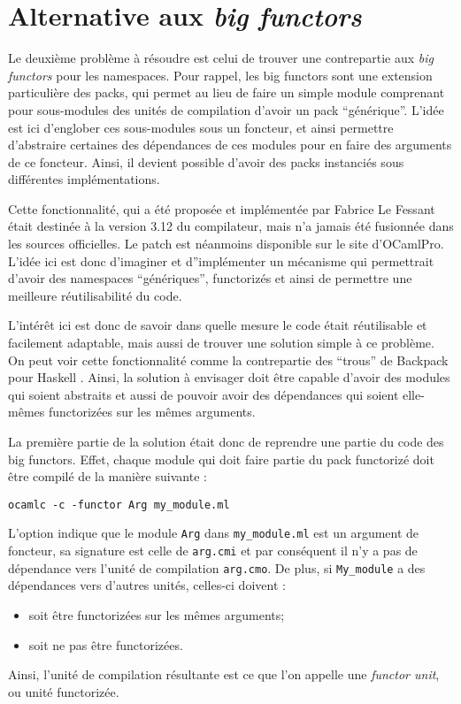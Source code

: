\documentclass[11pt,a4paper]{report}
\begin{document}
\section{Alternative aux \emph{big functors}}

Le deuxième problème à résoudre est celui de trouver une contrepartie aux
\emph{big functors} pour les namespaces. Pour rappel, les big functors sont une
extension particulière des packs, qui permet au lieu de faire un simple module
comprenant pour sous-modules des unités de compilation d'avoir un pack
``générique''. L'idée est ici d'englober ces sous-modules sous un foncteur, et
ainsi permettre d'abstraire certaines des dépendances de ces modules pour en
faire des arguments de ce foncteur. Ainsi, il devient possible d'avoir des packs
instanciés sous différentes implémentations.

Cette fonctionnalité, qui a été proposée et implémentée par Fabrice Le Fessant
était destinée à la version 3.12 du compilateur, mais n'a jamais été fusionnée
dans les sources officielles. Le patch est néanmoins disponible sur le site
d'OCamlPro. L'idée ici est donc d'imaginer et d''implémenter un mécanisme qui
permettrait d'avoir des namespaces ``génériques'', functorizés et ainsi de
permettre une meilleure réutilisabilité du code.

L'intérêt ici est donc de savoir dans quelle mesure le code était réutilisable
et facilement adaptable, mais aussi de trouver une solution simple à ce
problème. On peut voir cette fonctionnalité comme la contrepartie des ``trous''
de Backpack pour Haskell \cite{KilpatrickDJM14}. Ainsi, la solution à envisager
doit être capable d'avoir des modules qui soient abstraits et aussi de pouvoir
avoir des dépendances qui soient elle-mêmes functorizées sur les mêmes
arguments.

La première partie de la solution était donc de reprendre une partie du code des
big functors. Effet, chaque module qui doit faire partie du pack functorizé doit
être compilé de la manière suivante :
\begin{verbatim}
ocamlc -c -functor Arg my_module.ml
\end{verbatim}
L'option indique que le module \texttt{Arg} dans \texttt{my\_module.ml} est un
argument de foncteur, sa signature est celle de \texttt{arg.cmi} et par
conséquent il n'y a pas de dépendance vers l'unité de compilation
\texttt{arg.cmo}. De plus, si \texttt{My_module} a des dépendances vers d'autres
unités, celles-ci doivent :
\begin{itemize}
\item soit être functorizées sur les mêmes arguments;
\item soit ne pas être functorizées.
\end{itemize}
Ainsi, l'unité de compilation résultante est ce que l'on appelle une
\emph{functor unit}, ou unité functorizée. 
\end{document}
